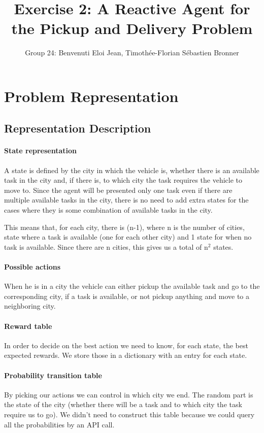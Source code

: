 \documentclass[11pt]{article}
\title{\bf Exercise 2: A Reactive Agent for the Pickup and Delivery Problem}
\author{Group 24: Benvenuti Eloi Jean, Timoth\'ee-Florian S\'ebastien Bronner}
\begin{document}
\maketitle

\section{Problem Representation}

\subsection{Representation Description}
\paragraph{State representation} A state is defined by the city in which the vehicle is, whether there is an available task in the city and, if there is, to which city the task requires the vehicle to move to. Since the agent will be presented only one task even if there are multiple available tasks in the city, there is no need to add extra states for the cases where they is some combination of available tasks in the city.

This means that, for each city, there is (n-1), where n is the number of cities, state where a task is available (one for each other city) and 1 state for when no task is available. Since there are n cities, this gives us a total of $\text{n}^2$ states.

\paragraph{Possible actions} When he is in a city the vehicle can either pickup the available task and go to the corresponding city, if a task is available, or not pickup anything and move to a neighboring city.

\paragraph{Reward table} In order to decide on the best action we need to know, for each state, the best expected rewards. We store those in a dictionary with an entry for each state.

\paragraph{Probability transition table} By picking our actions we can control in which city we end. The random part is the state of the city (whether there will be a task and to which city the task require us to go). We didn't need to construct this table because we could query all the probabilities by an API call.
\end{document}
